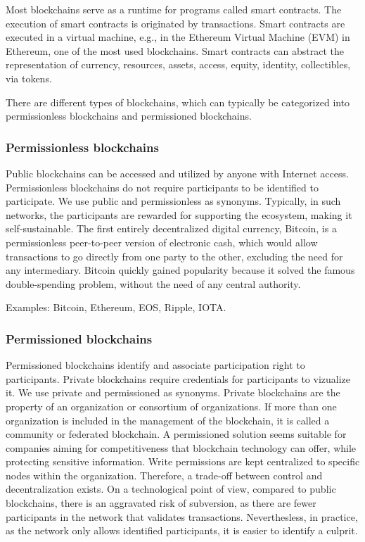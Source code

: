\documentclass[12pt,a4paper]{article}
\theoremstyle{definition}
\begin{document}
Most blockchains serve as a runtime for programs called smart contracts. The execution of smart contracts is originated by transactions. Smart contracts are executed in a virtual machine, e.g., in the Ethereum Virtual Machine (EVM) in Ethereum, one of the most used blockchains. Smart contracts can abstract the representation of currency, resources, assets, access, equity, identity, collectibles,  via tokens. 

There are different types of blockchains, which can typically be categorized into permissionless blockchains and permissioned blockchains.

\subsubsection{Permissionless blockchains}
Public blockchains can be accessed and utilized by anyone with Internet access. Permissionless blockchains do not require participants to be identified to participate. We use public and permissionless as synonyms. Typically, in such networks, the participants are rewarded for supporting the ecosystem, making it self-sustainable. The first entirely decentralized digital currency, Bitcoin, is a permissionless peer-to-peer version of electronic cash, which would allow transactions to go directly from one party to the other, excluding the need for any intermediary. Bitcoin quickly gained popularity because it solved the famous double-spending problem, without the need of any central authority. 

Examples: Bitcoin, Ethereum, EOS, Ripple, IOTA.

\subsubsection{Permissioned blockchains}
Permissioned blockchains identify and associate participation right to participants. Private blockchains require credentials for participants to vizualize it. We use private and permissioned as synonyms. Private blockchains are the property of an organization or consortium of organizations. If more than one organization is included in the management of the blockchain, it is called a community or federated blockchain. A permissioned solution seems suitable for companies aiming for competitiveness that blockchain technology can offer, while protecting sensitive information. Write permissions are kept centralized to specific nodes within the organization. Therefore, a trade-off between control and decentralization exists. On a technological point of view, compared to public blockchains, there is an aggravated risk of subversion, as there are fewer participants in the network that validates transactions. Neverthesless, in practice, as the network only allows identified participants, it is easier to identify a culprit.
\end{document}
